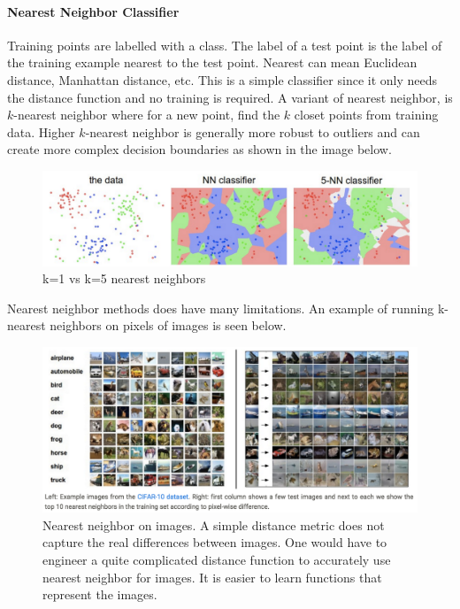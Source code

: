 \paragraph{Nearest Neighbor Classifier}
Training points are labelled with a class. The label of a test point is the label of the training example nearest to the test point. Nearest can mean Euclidean distance, Manhattan distance, etc.  This is a simple classifier since it only needs the distance function and no training is required. A variant of nearest neighbor, is $k$-nearest neighbor where for a new point, find the $k$ closet points from training data. Higher $k$-nearest neighbor is generally more robust to outliers and can create more complex decision boundaries as shown in the image below.
\begin{figure}
\caption{k=1 vs k=5 nearest neighbors}
\includegraphics{nearest_neighbor}
\end{figure}
Nearest neighbor methods does have many limitations. An example of running k-nearest neighbors on pixels of images is seen below.
\begin{figure}
\caption{Nearest neighbor on images. A simple distance metric does not capture the real differences between images. One would have to engineer a quite complicated distance function to accurately use nearest neighbor for images. It is easier to learn functions that represent the images.}
\includegraphics{cifar_nearest_neighbor}
\end{figure}
